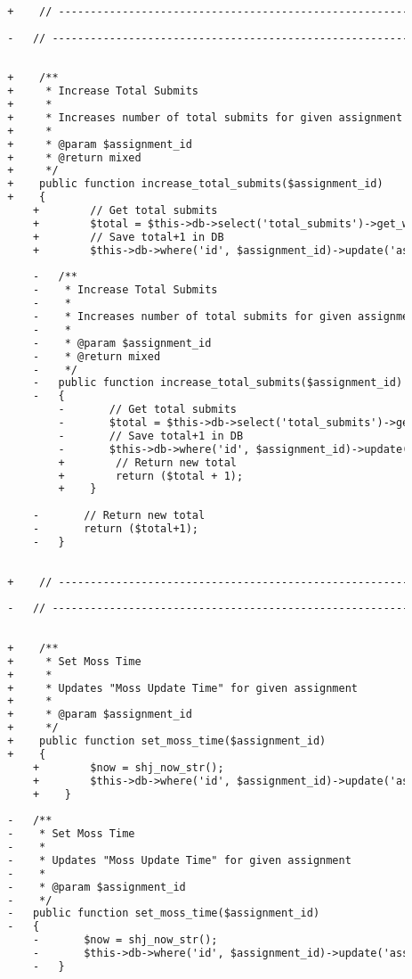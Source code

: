 \begin{lstlisting}[language=diff, caption=Perubahan pada kode Assignment\_model.php]
		
		+    // ------------------------------------------------------------------------
		
		-	// ------------------------------------------------------------------------
		
		
		+    /**
		+     * Increase Total Submits
		+     *
		+     * Increases number of total submits for given assignment by one
		+     *
		+     * @param $assignment_id
		+     * @return mixed
		+     */
		+    public function increase_total_submits($assignment_id)
		+    {
			+        // Get total submits
			+        $total = $this->db->select('total_submits')->get_where('assignments', array('id' => $assignment_id))->row()->total_submits;
			+        // Save total+1 in DB
			+        $this->db->where('id', $assignment_id)->update('assignments', array('total_submits' => ($total + 1)));
			
			-	/**
			-	 * Increase Total Submits
			-	 *
			-	 * Increases number of total submits for given assignment by one
			-	 *
			-	 * @param $assignment_id
			-	 * @return mixed
			-	 */
			-	public function increase_total_submits($assignment_id)
			-	{
				-		// Get total submits
				-		$total = $this->db->select('total_submits')->get_where('assignments', array('id'=>$assignment_id))->row()->total_submits;
				-		// Save total+1 in DB
				-		$this->db->where('id', $assignment_id)->update('assignments', array('total_submits'=>($total+1)));
				+        // Return new total
				+        return ($total + 1);
				+    }
			
			-		// Return new total
			-		return ($total+1);
			-	}
		
		
		+    // ------------------------------------------------------------------------
		
		-	// ------------------------------------------------------------------------
		
		
		+    /**
		+     * Set Moss Time
		+     *
		+     * Updates "Moss Update Time" for given assignment
		+     *
		+     * @param $assignment_id
		+     */
		+    public function set_moss_time($assignment_id)
		+    {
			+        $now = shj_now_str();
			+        $this->db->where('id', $assignment_id)->update('assignments', array('moss_update' => $now));
			+    }
		
		-	/**
		-	 * Set Moss Time
		-	 *
		-	 * Updates "Moss Update Time" for given assignment
		-	 *
		-	 * @param $assignment_id
		-	 */
		-	public function set_moss_time($assignment_id)
		-	{
			-		$now = shj_now_str();
			-		$this->db->where('id', $assignment_id)->update('assignments', array('moss_update'=>$now));
			-	}
		

\end{lstlisting}
